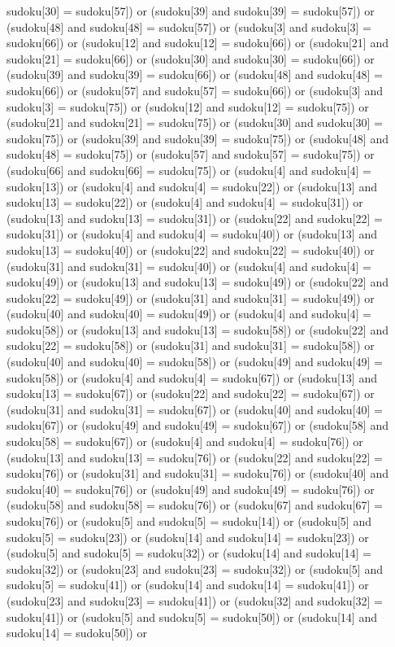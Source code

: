 \documentclass[8pt]{article}
\begin{document}
\begin{algorithm}[H]
sudoku[30] = sudoku[57]) or (sudoku[39]  and sudoku[39] = sudoku[57]) or (sudoku[48]  and sudoku[48] = sudoku[57]) or (sudoku[3]  and sudoku[3] = sudoku[66]) or (sudoku[12]  and sudoku[12] = sudoku[66]) or (sudoku[21]  and sudoku[21] = sudoku[66]) or (sudoku[30]  and sudoku[30] = sudoku[66]) or (sudoku[39]  and sudoku[39] = sudoku[66]) or (sudoku[48]  and sudoku[48] = sudoku[66]) or (sudoku[57]  and sudoku[57] = sudoku[66]) or (sudoku[3]  and sudoku[3] = sudoku[75]) or (sudoku[12]  and sudoku[12] = sudoku[75]) or (sudoku[21]  and sudoku[21] = sudoku[75]) or (sudoku[30]  and sudoku[30] = sudoku[75]) or (sudoku[39]  and sudoku[39] = sudoku[75]) or (sudoku[48]  and sudoku[48] = sudoku[75]) or (sudoku[57]  and sudoku[57] = sudoku[75]) or (sudoku[66]  and sudoku[66] = sudoku[75]) or (sudoku[4]  and sudoku[4] = sudoku[13]) or (sudoku[4]  and sudoku[4] = sudoku[22]) or (sudoku[13]  and sudoku[13] = sudoku[22]) or (sudoku[4]  and sudoku[4] = sudoku[31]) or (sudoku[13]  and sudoku[13] = sudoku[31]) or (sudoku[22]  and sudoku[22] = sudoku[31]) or (sudoku[4]  and sudoku[4] = sudoku[40]) or (sudoku[13]  and sudoku[13] = sudoku[40]) or (sudoku[22]  and sudoku[22] = sudoku[40]) or (sudoku[31]  and sudoku[31] = sudoku[40]) or (sudoku[4]  and sudoku[4] = sudoku[49]) or (sudoku[13]  and sudoku[13] = sudoku[49]) or (sudoku[22]  and sudoku[22] = sudoku[49]) or (sudoku[31]  and sudoku[31] = sudoku[49]) or (sudoku[40]  and sudoku[40] = sudoku[49]) or (sudoku[4]  and sudoku[4] = sudoku[58]) or (sudoku[13]  and sudoku[13] = sudoku[58]) or (sudoku[22]  and sudoku[22] = sudoku[58]) or (sudoku[31]  and sudoku[31] = sudoku[58]) or (sudoku[40]  and sudoku[40] = sudoku[58]) or (sudoku[49]  and sudoku[49] = sudoku[58]) or (sudoku[4]  and sudoku[4] = sudoku[67]) or (sudoku[13]  and sudoku[13] = sudoku[67]) or (sudoku[22]  and sudoku[22] = sudoku[67]) or (sudoku[31]  and sudoku[31] = sudoku[67]) or (sudoku[40]  and sudoku[40] = sudoku[67]) or (sudoku[49]  and sudoku[49] = sudoku[67]) or (sudoku[58]  and sudoku[58] = sudoku[67]) or (sudoku[4]  and sudoku[4] = sudoku[76]) or (sudoku[13]  and sudoku[13] = sudoku[76]) or (sudoku[22]  and sudoku[22] = sudoku[76]) or (sudoku[31]  and sudoku[31] = sudoku[76]) or (sudoku[40]  and sudoku[40] = sudoku[76]) or (sudoku[49]  and sudoku[49] = sudoku[76]) or (sudoku[58]  and sudoku[58] = sudoku[76]) or (sudoku[67]  and sudoku[67] = sudoku[76]) or (sudoku[5]  and sudoku[5] = sudoku[14]) or (sudoku[5]  and sudoku[5] = sudoku[23]) or (sudoku[14]  and sudoku[14] = sudoku[23]) or (sudoku[5]  and sudoku[5] = sudoku[32]) or (sudoku[14]  and sudoku[14] = sudoku[32]) or (sudoku[23]  and sudoku[23] = sudoku[32]) or (sudoku[5]  and sudoku[5] = sudoku[41]) or (sudoku[14]  and sudoku[14] = sudoku[41]) or (sudoku[23]  and sudoku[23] = sudoku[41]) or (sudoku[32]  and sudoku[32] = sudoku[41]) or (sudoku[5]  and sudoku[5] = sudoku[50]) or (sudoku[14]  and sudoku[14] = sudoku[50]) or 
\end{algorithm}
\end{document}
